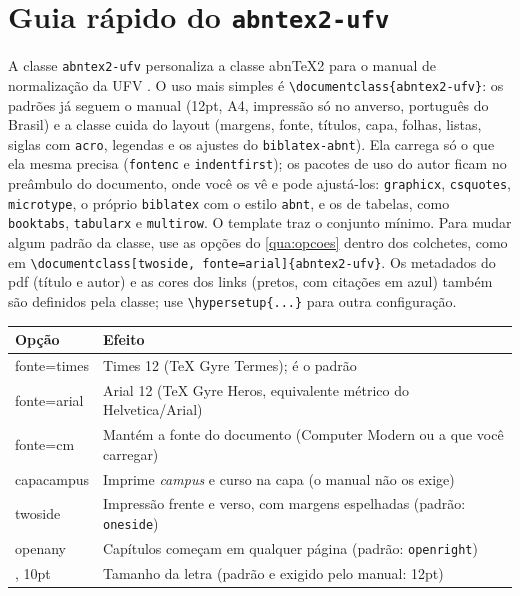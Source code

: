
\chapter{Guia rápido do \texttt{abntex2-ufv}}\label{ap:classe}

A classe \texttt{abntex2-ufv} personaliza a classe abn\TeX2 \cite{abntex2classe} para o
manual de normalização da UFV \cite{manualUFV}. O uso mais simples é
\texttt{\textbackslash documentclass\{abntex2-ufv\}}: os padrões já seguem o manual (12pt,
A4, impressão só no anverso, português do Brasil) e a classe cuida do layout (margens, fonte,
títulos, capa, folhas, listas, siglas com \texttt{acro}, legendas e os ajustes do
\texttt{biblatex-abnt}). Ela carrega só o que ela mesma precisa (\texttt{fontenc} e
\texttt{indentfirst}); os pacotes de uso do autor ficam no preâmbulo do documento, onde você os
vê e pode ajustá-los: \texttt{graphicx}, \texttt{csquotes}, \texttt{microtype}, o próprio
\texttt{biblatex} com o estilo \texttt{abnt}, e os de tabelas, como \texttt{booktabs},
\texttt{tabularx} e \texttt{multirow}. O template traz o conjunto mínimo. Para mudar algum
padrão da classe, use as opções do \autoref{qua:opcoes} dentro dos colchetes, como em
\texttt{\textbackslash documentclass[twoside, fonte=arial]\{abntex2-ufv\}}.
Os metadados do \ac{pdf} (título e autor) e as cores dos links (pretos, com citações em azul)
também são definidos pela classe; use \texttt{\textbackslash hypersetup\{...\}} para outra
configuração.

\begin{quadro}[htbp]
\begin{ilustracao}{\caption[Opções da classe abntex2-ufv]{Opções da classe \texttt{abntex2-ufv}}\label{qua:opcoes}}{\elaboracaopropria}
  \renewcommand{\arraystretch}{1.2}
  \small
  \begin{tabularx}{\textwidth}{|>{\ttfamily\raggedright\arraybackslash}p{3.4cm}|X|}
    \hline
    \textnormal{\textbf{Opção}} & \textbf{Efeito} \\
    \hline
    fonte=times & Times 12 (TeX Gyre Termes); é o padrão \\
    \hline
    fonte=arial & Arial 12 (TeX Gyre Heros, equivalente métrico do Helvetica/Arial) \\
    \hline
    fonte=cm & Mantém a fonte do documento (Computer Modern ou a que você carregar) \\
    \hline
    capacampus & Imprime \emph{campus} e curso na capa (o manual não os exige) \\
    \hline
    twoside & Impressão frente e verso, com margens espelhadas (padrão: \texttt{oneside}) \\
    \hline
    openany & Capítulos começam em qualquer página (padrão: \texttt{openright}) \\
    \hline
    11pt, 10pt & Tamanho da letra (padrão e exigido pelo manual: 12pt) \\
    \hline
  \end{tabularx}
\end{ilustracao}
\end{quadro}

